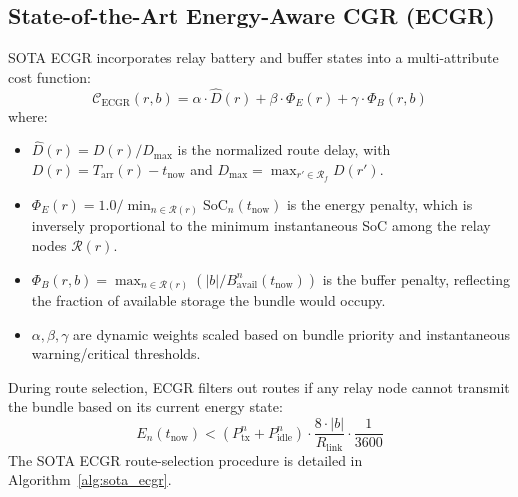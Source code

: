\documentclass[journal,twocolumn]{IEEEtran}
\newcommand{\ecgr}{\textsf{ECGR}}
\begin{document}
\subsection{State-of-the-Art Energy-Aware CGR (ECGR)}
SOTA \ecgr{} incorporates relay battery and buffer states into a multi-attribute cost function:
\begin{equation}
    \mathcal{C}_{\text{ECGR}}(r, b) = \alpha \cdot \hat{D}(r) + \beta \cdot \Phi_E(r) + \gamma \cdot \Phi_B(r, b)
\end{equation}
where:
\begin{itemize}
    \item $\hat{D}(r) = D(r) / D_{\max}$ is the normalized route delay, with $D(r) = T_{\text{arr}}(r) - t_{\text{now}}$ and $D_{\max} = \max_{r' \in \mathcal{R}_f} D(r')$.
    \item $\Phi_E(r) = 1.0 / \min_{n \in \mathcal{R}(r)} \text{SoC}_n(t_{\text{now}})$ is the energy penalty, which is inversely proportional to the minimum instantaneous SoC among the relay nodes $\mathcal{R}(r)$.
    \item $\Phi_B(r, b) = \max_{n \in \mathcal{R}(r)} (|b| / B_{\text{avail}}^n(t_{\text{now}}))$ is the buffer penalty, reflecting the fraction of available storage the bundle would occupy.
    \item $\alpha, \beta, \gamma$ are dynamic weights scaled based on bundle priority and instantaneous warning/critical thresholds.
\end{itemize}

During route selection, \ecgr{} filters out routes if any relay node cannot transmit the bundle based on its current energy state:
\begin{equation}
    E_n(t_{\text{now}}) < (P_{\text{tx}}^n + P_{\text{idle}}^n) \cdot \frac{8 \cdot |b|}{R_{\text{link}}} \cdot \frac{1}{3600}
\end{equation}
The SOTA \ecgr{} route-selection procedure is detailed in Algorithm~\ref{alg:sota_ecgr}.
\end{document}
